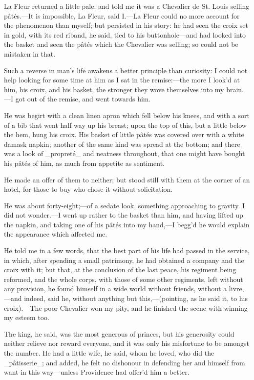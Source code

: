 \documentclass[twoside]{article}
\begin{document}
La Fleur returned a little pale; and told me it was a Chevalier de St.
Louis selling pâtés.—It is impossible, La Fleur, said I.—La Fleur could
no more account for the phenomenon than myself; but persisted in his
story: he had seen the croix set in gold, with its red riband, he said,
tied to his buttonhole—and had looked into the basket and seen the pâtés
which the Chevalier was selling; so could not be mistaken in that.

Such a reverse in man’s life awakens a better principle than curiosity: I
could not help looking for some time at him as I sat in the remise:—the
more I look’d at him, his croix, and his basket, the stronger they wove
themselves into my brain.—I got out of the remise, and went towards him.

He was begirt with a clean linen apron which fell below his knees, and
with a sort of a bib that went half way up his breast; upon the top of
this, but a little below the hem, hung his croix.  His basket of little
pâtés was covered over with a white damask napkin; another of the same
kind was spread at the bottom; and there was a look of _propreté_ and
neatness throughout, that one might have bought his pâtés of him, as much
from appetite as sentiment.

He made an offer of them to neither; but stood still with them at the
corner of an hotel, for those to buy who chose it without solicitation.

He was about forty-eight;—of a sedate look, something approaching to
gravity.  I did not wonder.—I went up rather to the basket than him, and
having lifted up the napkin, and taking one of his pâtés into my hand,—I
begg’d he would explain the appearance which affected me.

He told me in a few words, that the best part of his life had passed in
the service, in which, after spending a small patrimony, he had obtained
a company and the croix with it; but that, at the conclusion of the last
peace, his regiment being reformed, and the whole corps, with those of
some other regiments, left without any provision, he found himself in a
wide world without friends, without a livre,—and indeed, said he, without
anything but this,—(pointing, as he said it, to his croix).—The poor
Chevalier won my pity, and he finished the scene with winning my esteem
too.

The king, he said, was the most generous of princes, but his generosity
could neither relieve nor reward everyone, and it was only his misfortune
to be amongst the number.  He had a little wife, he said, whom he loved,
who did the _pâtisserie_; and added, he felt no dishonour in defending
her and himself from want in this way—unless Providence had offer’d him a
better.
\end{document}

